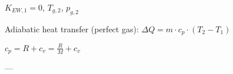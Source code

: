 \( K_{EW,1} = 0 \), \( T_{g,2} \), \( p_{g,2} \)  

Adiabatic heat transfer (perfect gas):  
\( \Delta Q = m \cdot c_p \cdot (T_2 - T_1) \)  

\( c_p = R + c_v = \frac{R}{M} + c_v \)  

---